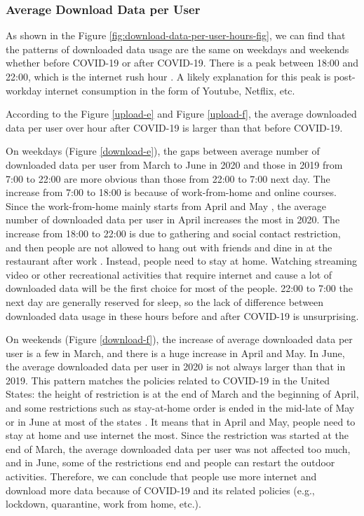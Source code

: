 \subsubsection{Average Download Data per User}
\label{sec:download-data-per-user-over-hours}


As shown in the Figure \ref{fig:download-data-per-user-hours-fig}, we can find that the patterns of downloaded data usage are the same on weekdays and weekends whether before COVID-19 or after COVID-19. There is a peak between 18:00 and 22:00, which is the internet rush hour \cite{internetrushhour}. A likely explanation for this peak is post-workday internet consumption in the form of Youtube, Netflix, etc. 

According to the Figure \ref{upload-e} and Figure \ref{upload-f}, the average downloaded data per user over hour after COVID-19 is larger than that before COVID-19. 

On weekdays (Figure \ref{download-e}), the gaps between average number of downloaded data per user from March to June in 2020 and those in 2019 from 7:00 to 22:00 are more obvious than those from 22:00 to 7:00 next day. The increase from 7:00 to 18:00 is because of work-from-home and online courses. Since the work-from-home mainly starts from April and May \cite{remotework}, the average number of downloaded data per user in April increases the most in 2020. The increase from 18:00 to 22:00 is due to gathering and social contact restriction, and then people are not allowed to hang out with friends and dine in at the restaurant after work \cite{lockdownsguide}. Instead, people need to stay at home. Watching streaming video or other recreational activities that require internet and cause a lot of downloaded data will be the first choice for most of the people. 22:00 to 7:00 the next day are generally reserved for sleep, so the lack of difference between downloaded data usage in these hours before and after COVID-19 is unsurprising. 

On weekends (Figure \ref{download-f}), the increase of average downloaded data per user is a few in March, and there is a huge increase in April and May. In June, the average downloaded data per user in 2020 is not always larger than that in 2019. This pattern matches the policies related to COVID-19 in the United States: the height of restriction is at the end of March and the beginning of April, and some restrictions such as stay-at-home order is ended in the mid-late of May or in June at most of the states \cite{covid19restriction}. It means that in April and May, people need to stay at home and use internet the most. Since the restriction was started at the end of March, the average downloaded data per user was not affected too much, and in June, some of the restrictions end and people can restart the outdoor activities. Therefore, we can conclude that people use more internet and download more data because of COVID-19 and its related policies (e.g., lockdown, quarantine, work from home, etc.). 


